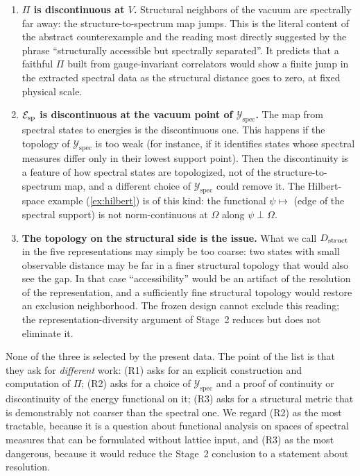 \documentclass[11pt,a4paper]{article}
\theoremstyle{definition}
\theoremstyle{remark}
\newcommand{\Yspec}{\mathcal{Y}_{\mathrm{spec}}}
\begin{document}
\begin{enumerate}[label=(R\arabic*)]
\item \textbf{$\Pi$ is discontinuous at $V$.} Structural neighbors of the vacuum are spectrally far away: the structure-to-spectrum map jumps. This is the literal content of the abstract counterexample and the reading most directly suggested by the phrase ``structurally accessible but spectrally separated''. It predicts that a faithful $\Pi$ built from gauge-invariant correlators would show a finite jump in the extracted spectral data as the structural distance goes to zero, at fixed physical scale.
\item \textbf{$\mathcal E_{\rm sp}$ is discontinuous at the vacuum point of $\Yspec$.} The map from spectral states to energies is the discontinuous one. This happens if the topology of $\Yspec$ is too weak (for instance, if it identifies states whose spectral measures differ only in their lowest support point). Then the discontinuity is a feature of how spectral states are topologized, not of the structure-to-spectrum map, and a different choice of $\Yspec$ could remove it. The Hilbert-space example (\cref{ex:hilbert}) is of this kind: the functional $\psi\mapsto$ (edge of the spectral support) is not norm-continuous at $\Omega$ along $\psi\perp\Omega$.
\item \textbf{The topology on the structural side is the issue.} What we call $D_{\rm struct}$ in the five representations may simply be too coarse: two states with small observable distance may be far in a finer structural topology that would also see the gap. In that case ``accessibility'' would be an artifact of the resolution of the representation, and a sufficiently fine structural topology would restore an exclusion neighborhood. The frozen design cannot exclude this reading; the representation-diversity argument of Stage~2 reduces but does not eliminate it.
\end{enumerate}

None of the three is selected by the present data. The point of the list is that they ask for \emph{different} work: (R1) asks for an explicit construction and computation of $\Pi$; (R2) asks for a choice of $\Yspec$ and a proof of continuity or discontinuity of the energy functional on it; (R3) asks for a structural metric that is demonstrably not coarser than the spectral one. We regard (R2) as the most tractable, because it is a question about functional analysis on spaces of spectral measures that can be formulated without lattice input, and (R3) as the most dangerous, because it would reduce the Stage~2 conclusion to a statement about resolution.
\end{document}
